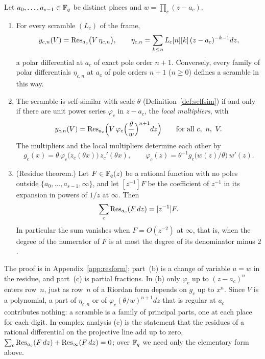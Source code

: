 \begin{lemma}\label{lem:resform}
Let $a_0,\dots,a_{s-1}\in\mathbb{F}_q$ be distinct places and $w=\prod_c(z-a_c)$.
\begin{enumerate}
\item[(a)] For every scramble $(L_c)$ of the frame,
\[
y_{c,n}(V)=\operatorname{Res}_{a_c}\bigl(V\,\eta_{c,n}\bigr),\qquad \eta_{c,n}=\sum_{k\le n}L_c[n][k]\,(z-a_c)^{-k-1}dz,
\]
a polar differential at $a_c$ of exact pole order $n+1$. Conversely, every family of polar differentials $\eta_{c,n}$ at $a_c$ of pole orders $n+1$ ($n\ge0$) defines a scramble in this way.
\item[(b)] The scramble is self-similar with scale $\theta$ (Definition~\ref{def:selfsim}) if and only if there are unit power series $\varphi_c$ in $z-a_c$, the \emph{local multipliers}, with
\[
y_{c,n}(V)=\operatorname{Res}_{a_c}\Bigl(V\,\varphi_c\Bigl(\frac\theta w\Bigr)^{n+1}dz\Bigr)\qquad\text{for all }c,\ n,\ V.
\]
The multipliers and the local multipliers determine each other by
\[
g_c(x)=\theta\,\varphi_c\bigl(z_c(\theta x)\bigr)\,z_c'(\theta x),\qquad \varphi_c(z)=\theta^{-1}g_c\bigl(w(z)/\theta\bigr)\,w'(z).
\]
\item[(c)] \textup{(Residue theorem.)} Let $F\in\mathbb{F}_q(z)$ be a rational function with no poles outside $\{a_0,\dots,a_{s-1},\infty\}$, and let $[z^{-1}]F$ be the coefficient of $z^{-1}$ in its expansion in powers of $1/z$ at $\infty$. Then
\[
\sum_{c}\operatorname{Res}_{a_c}(F\,dz)=[z^{-1}]F .
\]
In particular the sum vanishes when $F=O(z^{-2})$ at $\infty$, that is, when the degree of the numerator of $F$ is at most the degree of its denominator minus $2$.
\end{enumerate}
\end{lemma}

The proof is in Appendix~\ref{app:resform}; part~(b) is a change of variable $u=w$ in the residue, and part~(c) is partial fractions. In (b) only $\varphi_c$ up to $(z-a_c)^n$ enters row~$n$, just as row~$n$ of a Riordan form depends on $g_c$ up to $x^n$. Since $V$ is a polynomial, a part of $\eta_{c,n}$ or of $\varphi_c(\theta/w)^{n+1}dz$ that is regular at $a_c$ contributes nothing: a scramble is a family of principal parts, one at each place for each digit. In complex analysis (c) is the statement that the residues of a rational differential on the projective line add up to zero, $\sum_c\operatorname{Res}_{a_c}(F\,dz)+\operatorname{Res}_\infty(F\,dz)=0$; over $\mathbb{F}_q$ we need only the elementary form above.

